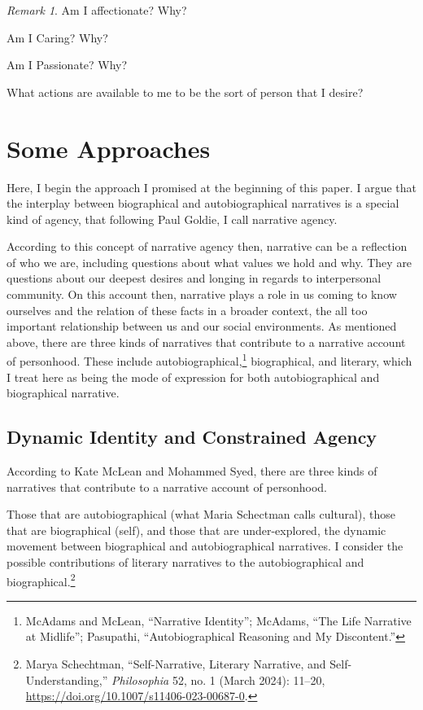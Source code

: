 \documentclass[phdthesis,12pt,final]{wuthesis}
\theoremstyle{definition}
\theoremstyle{definition}
\theoremstyle{definition}
\theoremstyle{definition}
\theoremstyle{remark}
\newtheorem*{remark}{Remark}
\begin{document}
\begin{remark}
Am I affectionate? Why?

Am I Caring? Why?

Am I Passionate? Why?
\end{remark}

What actions are available to me to be the sort of person that I desire?

\section{Some Approaches}\label{some-approaches}

Here, I begin the approach I promised at the beginning of this paper. I argue that the interplay between biographical and autobiographical narratives is a special kind of agency, that following Paul Goldie, I call narrative agency.

According to this concept of narrative agency then, narrative can be a reflection of who we are, including questions about what values we hold and why. They are questions about our deepest desires and longing in regards to interpersonal community. On this account then, narrative plays a role in us coming to know ourselves and the relation of these facts in a broader context, the all too important relationship between us and our social environments. As mentioned above, there are three kinds of narratives that contribute to a narrative account of personhood. These include autobiographical,\footnote{McAdams and McLean, {``Narrative {Identity}''}; McAdams, {``The {Life Narrative} at {Midlife}''}; Pasupathi, {``Autobiographical {Reasoning} and {My} {Discontent}.''}} biographical, and literary, which I treat here as being the mode of expression for both autobiographical and biographical narrative.

\subsection{Dynamic Identity and Constrained Agency}\label{dynamic-identity-and-constrained-agency}

According to Kate McLean and Mohammed Syed, there are three kinds of narratives that contribute to a narrative account of personhood.

Those that are autobiographical (what Maria Schectman calls cultural), those that are biographical (self), and those that are under-explored, the dynamic movement between biographical and autobiographical narratives. I consider the possible contributions of literary narratives to the autobiographical and biographical.\footnote{Marya Schechtman, {``Self-{Narrative}, {Literary Narrative}, and {Self-Understanding},''} \emph{Philosophia} 52, no. 1 (March 2024): 11--20, \url{https://doi.org/10.1007/s11406-023-00687-0}.}
\end{document}
